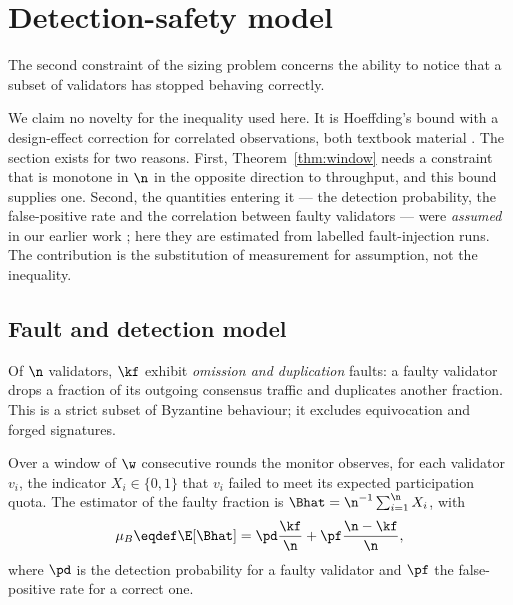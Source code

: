 \section{Detection-safety model}
\label{sec:safety}

The second constraint of the sizing problem concerns the ability to notice that
a subset of validators has stopped behaving correctly.

We claim no novelty for the inequality used here. It is Hoeffding's bound with
a design-effect correction for correlated observations, both textbook material
\cite{hoeffding1963,boucheron2013}. The section exists for two reasons. First,
Theorem~\ref{thm:window} needs a constraint that is monotone in $\n$ in the
opposite direction to throughput, and this bound supplies one. Second, the
quantities entering it --- the detection probability, the false-positive rate
and the correlation between faulty validators --- were \emph{assumed} in our
earlier work \cite{peniak2026b}; here they are estimated from labelled
fault-injection runs. The contribution is the substitution of measurement for
assumption, not the inequality.

\subsection{Fault and detection model}

\begin{Def}
\label{def:faults}
Of $\n$ validators, $\kf$ exhibit \emph{omission and duplication} faults: a
faulty validator drops a fraction of its outgoing consensus traffic and
duplicates another fraction. This is a strict subset of Byzantine behaviour; it
excludes equivocation and forged signatures.
\end{Def}

\begin{Def}
\label{def:detector}
Over a window of $\w$ consecutive rounds the monitor observes, for each
validator $v_{i}$, the indicator $X_{i}\in\{0,1\}$ that $v_{i}$ failed to meet
its expected participation quota. The estimator of the faulty fraction is
$\Bhat=\n^{-1}\sum_{i=1}^{\n}X_{i}$, with
\begin{equation}
\mu_{B}\eqdef\E[\Bhat]=\pd\frac{\kf}{\n}+\pf\frac{\n-\kf}{\n},
\label{eq:muB}
\end{equation}
where $\pd$ is the detection probability for a faulty validator and $\pf$ the
false-positive rate for a correct one.
\end{Def}

